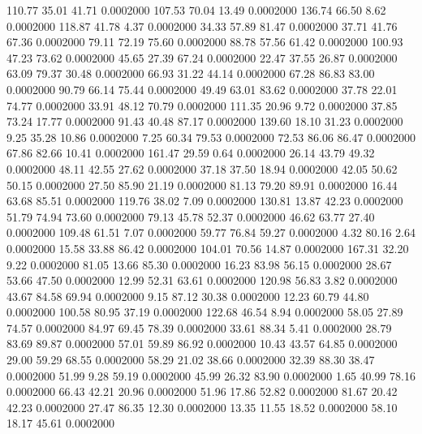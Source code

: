  110.77   35.01   41.71   0.0002000
 107.53   70.04   13.49   0.0002000
 136.74   66.50    8.62   0.0002000
 118.87   41.78    4.37   0.0002000
  34.33   57.89   81.47   0.0002000
  37.71   41.76   67.36   0.0002000
  79.11   72.19   75.60   0.0002000
  88.78   57.56   61.42   0.0002000
 100.93   47.23   73.62   0.0002000
  45.65   27.39   67.24   0.0002000
  22.47   37.55   26.87   0.0002000
  63.09   79.37   30.48   0.0002000
  66.93   31.22   44.14   0.0002000
  67.28   86.83   83.00   0.0002000
  90.79   66.14   75.44   0.0002000
  49.49   63.01   83.62   0.0002000
  37.78   22.01   74.77   0.0002000
  33.91   48.12   70.79   0.0002000
 111.35   20.96    9.72   0.0002000
  37.85   73.24   17.77   0.0002000
  91.43   40.48   87.17   0.0002000
 139.60   18.10   31.23   0.0002000
   9.25   35.28   10.86   0.0002000
   7.25   60.34   79.53   0.0002000
  72.53   86.06   86.47   0.0002000
  67.86   82.66   10.41   0.0002000
 161.47   29.59    0.64   0.0002000
  26.14   43.79   49.32   0.0002000
  48.11   42.55   27.62   0.0002000
  37.18   37.50   18.94   0.0002000
  42.05   50.62   50.15   0.0002000
  27.50   85.90   21.19   0.0002000
  81.13   79.20   89.91   0.0002000
  16.44   63.68   85.51   0.0002000
 119.76   38.02    7.09   0.0002000
 130.81   13.87   42.23   0.0002000
  51.79   74.94   73.60   0.0002000
  79.13   45.78   52.37   0.0002000
  46.62   63.77   27.40   0.0002000
 109.48   61.51    7.07   0.0002000
  59.77   76.84   59.27   0.0002000
   4.32   80.16    2.64   0.0002000
  15.58   33.88   86.42   0.0002000
 104.01   70.56   14.87   0.0002000
 167.31   32.20    9.22   0.0002000
  81.05   13.66   85.30   0.0002000
  16.23   83.98   56.15   0.0002000
  28.67   53.66   47.50   0.0002000
  12.99   52.31   63.61   0.0002000
 120.98   56.83    3.82   0.0002000
  43.67   84.58   69.94   0.0002000
   9.15   87.12   30.38   0.0002000
  12.23   60.79   44.80   0.0002000
 100.58   80.95   37.19   0.0002000
 122.68   46.54    8.94   0.0002000
  58.05   27.89   74.57   0.0002000
  84.97   69.45   78.39   0.0002000
  33.61   88.34    5.41   0.0002000
  28.79   83.69   89.87   0.0002000
  57.01   59.89   86.92   0.0002000
  10.43   43.57   64.85   0.0002000
  29.00   59.29   68.55   0.0002000
  58.29   21.02   38.66   0.0002000
  32.39   88.30   38.47   0.0002000
  51.99    9.28   59.19   0.0002000
  45.99   26.32   83.90   0.0002000
   1.65   40.99   78.16   0.0002000
  66.43   42.21   20.96   0.0002000
  51.96   17.86   52.82   0.0002000
  81.67   20.42   42.23   0.0002000
  27.47   86.35   12.30   0.0002000
  13.35   11.55   18.52   0.0002000
  58.10   18.17   45.61   0.0002000
